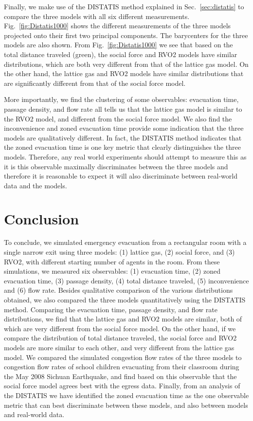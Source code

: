 Finally, we make use of the DISTATIS method explained in Sec.~\ref{sec:distatis} to compare the three models with all six different measurements. Fig.~\ref{fig:Distatis1000} shows the different measurements of the three models projected onto their first two principal components. The barycenters for the three models are also shown. From Fig.~\ref{fig:Distatis1000} we see that based on the total distance traveled (green), the social force and RVO2 models have similar distributions, which are both very different from that of the lattice gas model. On the other hand, the lattice gas and RVO2 models have similar distributions that are significantly different from that of the social force model.

More importantly, we find the clustering of some observables: evacuation time, passage density, and flow rate all tells us that the lattice gas model is similar to the RVO2 model, and different from the social force model. We also find the inconvenience and zoned evacuation time provide some indication that the three models are qualitatively different. In fact, the DISTATIS method indicates that the zoned evacuation time is one key metric that clearly distinguishes the three models. Therefore, any real world experiments should attempt to measure this as it is this observable maximally discriminates between the three models and therefore it is reasonable to expect it will also discriminate between real-world data and the models.

\section{Conclusion}
\label{Conclusions}

To conclude, we simulated emergency evacuation from a rectangular room with a single narrow exit using three models: (1) lattice gas, (2) social force, and (3) RVO2, with different starting number of agents in the room. From these simulations, we measured six observables: (1) evacuation time, (2) zoned evacuation time, (3) passage density, (4) total distance traveled, (5) inconvenience and (6) flow rate. Besides qualitative comparison of the various distributions obtained, we also compared the three models quantitatively using the DISTATIS method. Comparing the evacuation time, passage density, and flow rate distributions, we find that the lattice gas and RVO2 models are similar, both of which are very different from the social force model. On the other hand, if we compare the distribution of total distance traveled, the social force and RVO2 models are more similar to each other, and very different from the lattice gas model. We compared the simulated congestion flow rates of the three models to congestion flow rates of school children evacuating from their classroom during the May 2008 Sichuan Earthquake, and find based on this observable that the social force model agrees best with the egress data. Finally, from an analysis of the DISTATIS we have identified the zoned evacuation time as the one observable metric that can best discriminate between these models, and also between models and real-world data.

